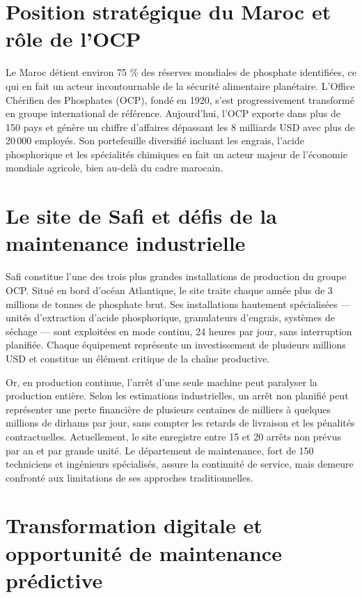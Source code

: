 \documentclass[a4paper,12pt,twoside]{report}
\begin{document}
\section*{Position stratégique du Maroc et rôle de l'OCP}

Le Maroc détient environ 75 \% des réserves mondiales de phosphate identifiées, ce qui en fait un acteur incontournable de la sécurité alimentaire planétaire. L'Office Chérifien des Phosphates (OCP), fondé en 1920, s'est progressivement transformé en groupe international de référence. Aujourd'hui, l'OCP exporte dans plus de 150 pays et génère un chiffre d'affaires dépassant les 8 milliards USD avec plus de 20\,000 employés. Son portefeuille diversifié incluant les engrais, l'acide phosphorique et les spécialités chimiques en fait un acteur majeur de l'économie mondiale agricole, bien au-delà du cadre marocain.

\section*{Le site de Safi et défis de la maintenance industrielle}

Safi constitue l'une des trois plus grandes installations de production du groupe OCP. Situé en bord d'océan Atlantique, le site traite chaque année plus de 3 millions de tonnes de phosphate brut. Ses installations hautement spécialisées --- unités d'extraction d'acide phosphorique, granulateurs d'engrais, systèmes de séchage --- sont exploitées en mode continu, 24 heures par jour, sans interruption planifiée. Chaque équipement représente un investissement de plusieurs millions USD et constitue un élément critique de la chaîne productive.

Or, en production continue, l'arrêt d'une seule machine peut paralyser la production entière. Selon les estimations industrielles, un arrêt non planifié peut représenter une perte financière de plusieurs centaines de milliers à quelques millions de dirhams par jour, sans compter les retards de livraison et les pénalités contractuelles. Actuellement, le site enregistre entre 15 et 20 arrêts non prévus par an et par grande unité. Le département de maintenance, fort de 150 techniciens et ingénieurs spécialisés, assure la continuité de service, mais demeure confronté aux limitations de ses approches traditionnelles.

\section*{Transformation digitale et opportunité de maintenance prédictive}
\end{document}
